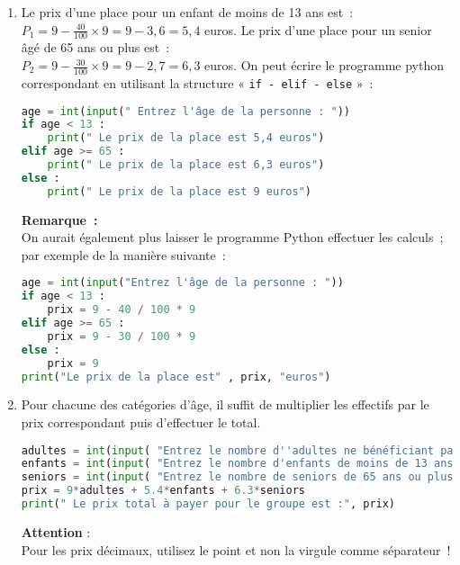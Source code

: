 \begin{corrige}
     \begin{enumerate}
          \item
          Le prix d'une place pour un enfant de moins de 13 ans est~:\\
          $ P_{ 1}=9 - \frac{ 40}{ 100 }  \times 9=9 - 3,6=5,4 $ euros.
          \newpar
          Le prix d'une place pour un senior âgé de 65 ans ou plus est~:\\
          $ P_{ 2}=9 - \frac{ 30}{ 100 }  \times 9=9 - 2,7=6,3 $ euros.
          \newpar
          On peut écrire le programme python correspondant en utilisant la structure « \texttt{if - elif - else} »~:
\begin{lstlisting}[language=Python]
age = int(input(" Entrez l'âge de la personne : "))
if age < 13 :
    print(" Le prix de la place est 5,4 euros")
elif age >= 65 :
    print(" Le prix de la place est 6,3 euros")
else : 
    print(" Le prix de la place est 9 euros")
          \end{lstlisting}
          \newpar
          \textbf{Remarque~:}\\
          On aurait également plus laisser le programme Python effectuer les calculs~; par exemple de la manière suivante~:
\begin{lstlisting}[language=Python]
age = int(input("Entrez l'âge de la personne : "))
if age < 13 :
    prix = 9 - 40 / 100 * 9
elif age >= 65 :
    prix = 9 - 30 / 100 * 9
else :
    prix = 9
print("Le prix de la place est" , prix, "euros")
     \end{lstlisting}
     \item
     Pour chacune des catégories d'âge, il suffit de multiplier les effectifs par le prix correspondant puis d'effectuer le total.
\begin{lstlisting}[language=Python]
adultes = int(input( "Entrez le nombre d''adultes ne bénéficiant pas de réduction : "))
enfants = int(input( "Entrez le nombre d'enfants de moins de 13 ans : "))
seniors = int(input( "Entrez le nombre de seniors de 65 ans ou plus : "))
prix = 9*adultes + 5.4*enfants + 6.3*seniors
print(" Le prix total à payer pour le groupe est :", prix)
\end{lstlisting}
\textbf{Attention} :\\
Pour les prix décimaux, utilisez le point et non la virgule comme séparateur~!
\end{enumerate}
\end{corrige}
